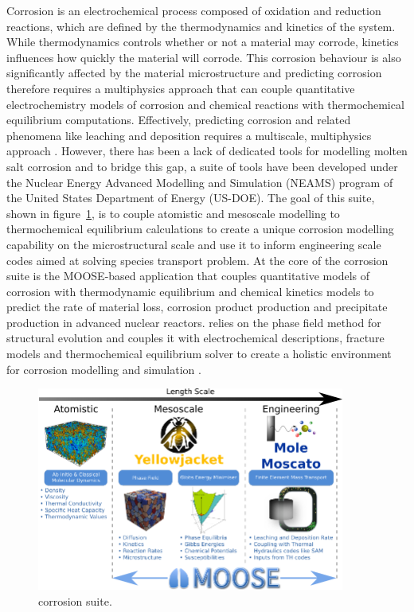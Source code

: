 	Corrosion is an electrochemical process composed of oxidation and reduction reactions, which are defined by the thermodynamics and kinetics of the system. While thermodynamics controls whether or not a material may corrode, kinetics influences how quickly the material will corrode. This corrosion behaviour is also significantly affected by the material microstructure and predicting corrosion therefore requires a multiphysics approach that can couple quantitative electrochemistry models of corrosion and chemical reactions with thermochemical equilibrium computations. Effectively, predicting corrosion and related phenomena like leaching and deposition requires a multiscale, multiphysics approach \cite{Mcmurray:2018aa}. However, there has been a lack of dedicated tools for modelling molten salt corrosion and to bridge this gap, a suite of tools have been developed under the Nuclear Energy Advanced Modelling and Simulation (NEAMS) program of the United States Department of Energy (US-DOE). The goal of this suite, shown in figure~\ref{fig:yj_suite}, is to couple atomistic and mesoscale modelling to thermochemical equilibrium calculations to create a unique corrosion modelling capability on the microstructural scale and use it to inform engineering scale codes aimed at solving species transport problem. At the core of the corrosion suite is the MOOSE-based application {\YJ} that couples quantitative models of corrosion with thermodynamic equilibrium and chemical kinetics models to predict the rate of material loss, corrosion product production and precipitate production in advanced nuclear reactors. {\YJ} relies on the phase field method for structural evolution and couples it with electrochemical descriptions, fracture models and thermochemical equilibrium solver to create a holistic environment for corrosion modelling and simulation \cite{Bhave:2022aa}.
	\begin{figure}[htb]
		\centering
		\includegraphics[width=0.9\textwidth]{figures/chapter-1/Yellowjacket_Suite.png}
		\caption{{\YJ} corrosion suite.}
		\label{fig:yj_suite}
	\end{figure}

